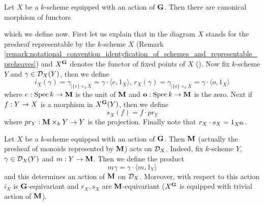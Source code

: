 \begin{remark}\label{remark:bb_diagram}
Let $X$ be a $k$-scheme equipped with an action of $\mathbf{G}$. Then there are canonical morphism of functors
\begin{center}
\end{center}
which we define now. First let us explain that in the diagram $X$ stands for the presheaf representable by the $k$-scheme $X$ (Remark \ref{remark:notational_convention_identyfication_of_schemes_and_representable_preheaves}) and $X^{\mathbf{G}}$ denotes the functor of fixed points of $X$ ({\cite[Definition 7.1]{Group_schemes_over_field}}). Now fix $k$-scheme $Y$ and $\gamma\in {\mathcal D}_X(Y)$, then we define
$$i_X(\gamma) = \gamma_{\mid \{e\}\times_kX} = \gamma \cdot \langle e, 1_X\rangle,\,r_X(\gamma) = \gamma_{\mid \{o\}\times_kX} = \gamma\cdot \langle o, 1_X\rangle$$
where $e:\mathrm{Spec}\, k\rightarrow \mathbf{M}$ is the unit of $\mathbf{M}$ and $\mathbf{o}:\mathrm{Spec}\, k\rightarrow \mathbf{M}$ is the zero. Next if $f:Y\rightarrow X$ is a morphism in $X^{\mathbf{G}}(Y)$, then we define
$$s_X(f) = f\cdot pr_Y$$
where $pr_Y:\mathbf{M}\times_kY\rightarrow Y$ is the projection. Finally note that $r_X\cdot s_X = 1_{X^{\mathbf{G}}}$.
\end{remark}

\begin{remark}\label{remark:action_of_a_monoid_on_bb_functor}
Let $X$ be a $k$-scheme equipped with an action of $\mathbf{G}$. Then $\mathbf{M}$ (actually the presheaf of monoids represented by $\mathbf{M}$) acts on ${\mathcal D}_X$. Indeed, fix $k$-scheme $Y$, $\gamma \in {\mathcal D}_X(Y)$ and $m:Y\rightarrow \mathbf{M}$. Then we define the product
$$m\gamma = \gamma\cdot \langle m, 1_Y\rangle$$
and this determines an action of $\mathbf{M}$ on ${\mathcal D}_X$. Moreover, with respect to this action $i_X$ is $\mathbf{G}$-equivariant and $r_X,s_X$ are $\mathbf{M}$-equivariant ($X^{\mathbf{G}}$ is equipped with trivial action of $\mathbf{M}$).
\end{remark}

